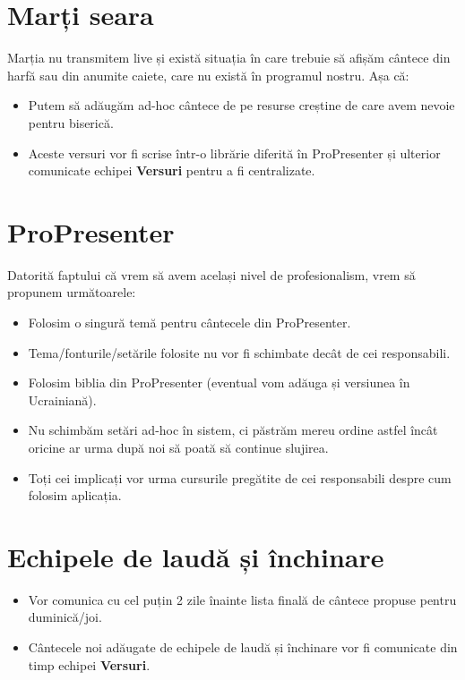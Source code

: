 \documentclass[draft,epjST]{svjour}
\begin{document}
    \section{Marți seara}\label{sec:6}
    Marția nu transmitem live și există situația în care trebuie să afișăm cântece din harfă sau din anumite caiete, care nu există în programul nostru. Așa că:
    \begin{itemize}
        \item Putem să adăugăm ad-hoc cântece de pe resurse creștine de care avem nevoie pentru biserică.
        \item Aceste versuri vor fi scrise într-o librărie diferită în ProPresenter și ulterior comunicate echipei \textbf{Versuri} pentru a fi centralizate.
    \end{itemize}
%


    \section{ProPresenter}\label{sec:7}
    Datorită faptului că vrem să avem același nivel de profesionalism, vrem să propunem următoarele:
    \begin{itemize}
        \item Folosim o singură temă pentru cântecele din ProPresenter.
        \item Tema/fonturile/setările folosite nu vor fi schimbate decât de cei responsabili.
        \item Folosim biblia din ProPresenter (eventual vom adăuga și versiunea în Ucrainiană).
        \item Nu schimbăm setări ad-hoc în sistem, ci păstrăm mereu ordine astfel încât oricine ar urma după noi să poată să continue slujirea.
        \item Toți cei implicați vor urma cursurile pregătite de cei responsabili despre cum folosim aplicația.
    \end{itemize}
%


    \section{Echipele de laudă și închinare}\label{sec:8}
    \begin{itemize}
        \item Vor comunica cu cel puțin 2 zile înainte lista finală de cântece propuse pentru duminică/joi.
        \item Cântecele noi adăugate de echipele de laudă și închinare vor fi comunicate din timp echipei \textbf{Versuri}.
    \end{itemize}
\end{document}
